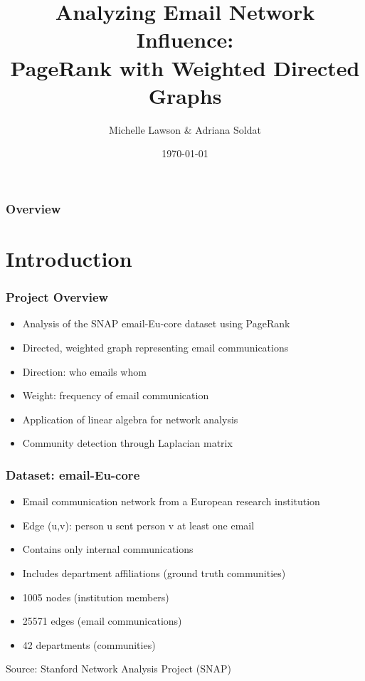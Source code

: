 \documentclass{beamer}
\title[PageRank Analysis]{Analyzing Email Network Influence:\\PageRank with Weighted Directed Graphs}
\author{Michelle Lawson \& Adriana Soldat}
\institute{Linear Algebra Final Project}
\date{\today}
\begin{document}
\begin{frame}
    \titlepage
\end{frame}

\begin{frame}
    \frametitle{Overview}
    \tableofcontents
\end{frame}

\section{Introduction}

\begin{frame}
    \frametitle{Project Overview}
    \begin{itemize}
        \item Analysis of the SNAP email-Eu-core dataset using PageRank
        \item Directed, weighted graph representing email communications
        \item Direction: who emails whom
        \item Weight: frequency of email communication
        \item Application of linear algebra for network analysis
        \item Community detection through Laplacian matrix
    \end{itemize}
\end{frame}

\begin{frame}
    \frametitle{Dataset: email-Eu-core}
    \begin{itemize}
        \item Email communication network from a European research institution
        \item Edge (u,v): person u sent person v at least one email
        \item Contains only internal communications
        \item Includes department affiliations (ground truth communities)
        \item 1005 nodes (institution members)
        \item 25571 edges (email communications)
        \item 42 departments (communities)
    \end{itemize}
    \small{Source: Stanford Network Analysis Project (SNAP)}
\end{frame}
\end{document}
